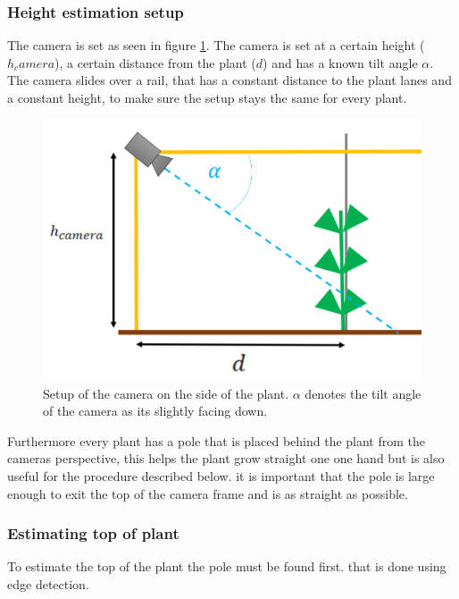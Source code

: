 \subsubsection{Height estimation setup}
The camera  is set as seen in figure \ref{fig:setupSide}. The camera is set at a certain height ($h_camera$), a certain distance from the plant ($d$) and has a known tilt angle $\alpha$. The camera slides over a rail, that has a constant distance to the plant lanes and a constant height, to make sure the setup stays the same for every plant.
   \begin{figure}[H]
       \centering
       \includegraphics[scale=0.6]{setupSide.PNG}
       \caption{Setup of the camera on the side of the plant. $\alpha$ denotes the tilt angle of the camera as its slightly facing down. }
       \label{fig:setupSide}
   \end{figure}
Furthermore every plant has a pole that is placed behind the plant from the cameras perspective, this helps the plant grow straight one one hand but is also useful for the procedure described below. it is important that the pole is large enough to exit the top of the camera frame and is as straight as possible.
\subsubsection{Estimating top of plant}
To estimate the top of the plant the pole must be found first. that is done using edge detection.
